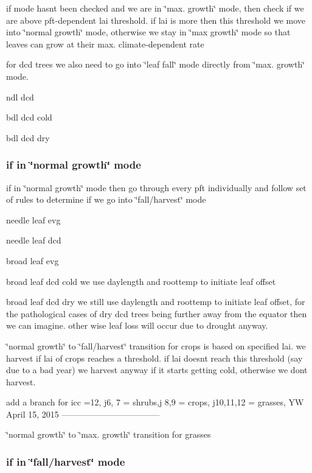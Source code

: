 if mode hasn\textquotesingle{}t been checked and we are in \char`\"{}max. growth\char`\"{} mode, then check if we are above pft-\/dependent lai threshold. if lai is more then this threshold we move into \char`\"{}normal growth\char`\"{} mode, otherwise we stay in \char`\"{}max growth\char`\"{} mode so that leaves can grow at their max. climate-\/dependent rate

for dcd trees we also need to go into \char`\"{}leaf fall\char`\"{} mode directly from \char`\"{}max. growth\char`\"{} mode.

ndl dcd

bdl dcd cold

bdl dcd dry

\subsubsection*{if in \char`\"{}normal growth\char`\"{} mode }

if in \char`\"{}normal growth\char`\"{} mode then go through every pft individually and follow set of rules to determine if we go into \char`\"{}fall/harvest\char`\"{} mode

needle leaf evg

needle leaf dcd

broad leaf evg

broad leaf dcd cold we use daylength and roottemp to initiate leaf offset

broad leaf dcd dry we still use daylength and roottemp to initiate leaf offset, for the pathological cases of dry dcd trees being further away from the equator then we can imagine. other wise leaf loss will occur due to drought anyway.

\char`\"{}normal growth\char`\"{} to \char`\"{}fall/harvest\char`\"{} transition for crops is based on specified lai. we harvest if lai of crops reaches a threshold. if lai doesn\textquotesingle{}t reach this threshold (say due to a bad year) we harvest anyway if it starts getting cold, otherwise we don\textquotesingle{}t harvest.

\begin{DoxyVerb}add a branch for icc =12, j6, 7 = shrubs,j 8,9 = crops, j10,11,12
= grasses, YW April 15, 2015 -----------------------------------\ \end{DoxyVerb}


\char`\"{}normal growth\char`\"{} to \char`\"{}max. growth\char`\"{} transition for grasses

\subsubsection*{if in \char`\"{}fall/harvest\char`\"{} mode }

